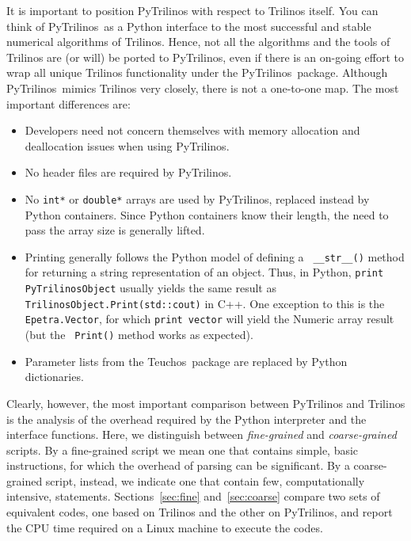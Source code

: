 \documentclass[acmtocl]{acmtrans2m}
\newcommand{\PyTrilinos}{{PyTrilinos}}
\newcommand{\teuchos}{{Teuchos}}
\begin{document}
It is important to position PyTrilinos with respect to Trilinos
itself. You can think of \PyTrilinos\ as a Python interface to the
most successful and stable numerical algorithms of Trilinos.  Hence,
not all the algorithms and the tools of Trilinos are (or will) be
ported to \PyTrilinos, even if there is an on-going effort to wrap all
unique Trilinos functionality under the \PyTrilinos\ package.
Although \PyTrilinos\ mimics Trilinos very closely, there is not a
one-to-one map. The most important differences are:

\begin{itemize}

\item Developers need not concern themselves with memory allocation
  and deallocation issues when using \PyTrilinos.

\item No header files are required by \PyTrilinos.

\item No {\tt int*} or {\tt double*} arrays are used by \PyTrilinos,
  replaced instead by Python containers.  Since Python containers know
  their length, the need to pass the array size is generally lifted.

\item Printing generally follows the Python model of defining a {\tt
  \_\_str\_\_()} method for returning a string representation of an
  object.  Thus, in Python, {\tt print PyTrilinosObject} usually
  yields the same result as {\tt TrilinosObject.Print(std::cout)} in
  C++.  One exception to this is the {\tt Epetra.Vector}, for which
  {\tt print vector} will yield the Numeric array result (but the {\tt
    Print()} method works as expected).

\item Parameter lists from the \teuchos\ package are replaced by
  Python dictionaries.

\end{itemize}

Clearly, however, the most important comparison between PyTrilinos and
Trilinos is the analysis of the overhead required by the Python
interpreter and the interface functions. Here, we distinguish between
{\sl fine-grained} and {\sl coarse-grained} scripts. By a fine-grained
script we mean one that contains simple, basic instructions, for which
the overhead of parsing can be significant. By a coarse-grained
script, instead, we indicate one that contain few, computationally
intensive, statements.  Sections~\ref{sec:fine} and~\ref{sec:coarse}
compare two sets of equivalent codes, one based on Trilinos and the
other on PyTrilinos, and report the CPU time required on a Linux
machine to execute the codes.
\end{document}
